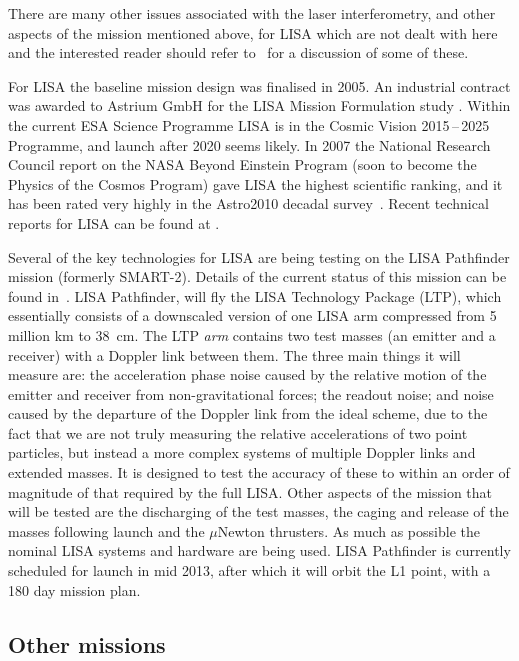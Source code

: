 \documentclass{article}
\begin{document}
There are many other issues associated with the laser interferometry, and other
aspects of the mission mentioned above, for LISA which are not dealt with here
and the interested reader should refer to~\cite{Houghetal, Jennrich:2009,
Johann:2008} for a discussion of some of these.

For LISA the baseline mission design was finalised in 2005. An industrial
contract was awarded to Astrium GmbH for the LISA Mission Formulation study
\cite{Johann:2008}. Within the current ESA Science Programme LISA is in the
Cosmic Vision 2015\,--\,2025 Programme, and launch after 2020 seems likely.
In 2007 the National Research Council report on the NASA Beyond Einstein Program
(soon to become the Physics of the Cosmos Program) gave LISA the highest
scientific ranking, and it has been rated very highly in the Astro2010 decadal
survey~\cite{astro2010}. Recent technical reports for LISA can be found at
\cite{LISATechReports}.

Several of the key technologies for LISA are being testing on the LISA
Pathfinder mission (formerly SMART-2). Details of the current status of this
mission can be found in~\cite{Armano:2009}. LISA Pathfinder, will fly the LISA
Technology Package (LTP), which essentially consists of a downscaled version of
one LISA arm compressed from 5 million km to 38~cm. The LTP \textit{arm} contains
two test masses (an emitter and a receiver) with a Doppler link between them.
The three main things it will measure are: the acceleration phase noise caused
by the relative motion of the emitter and receiver from non-gravitational
forces; the readout noise; and noise caused by the departure of the Doppler link
from the ideal scheme, due to the fact that we are not truly measuring the
relative accelerations of two point particles, but instead a more complex
systems of multiple Doppler links and extended masses. It is designed to test
the accuracy of these to within an order  of magnitude of that required by
the full LISA. Other aspects of the mission that will be tested are the
discharging of the test masses, the caging and release of the masses following
launch and the $\mu$Newton thrusters. As much as possible the nominal LISA
systems and hardware are being used. LISA Pathfinder is currently scheduled for
launch in mid 2013, after which it will orbit the L1 point, with a 180 day
mission plan.

\subsection{Other missions}
\end{document}
